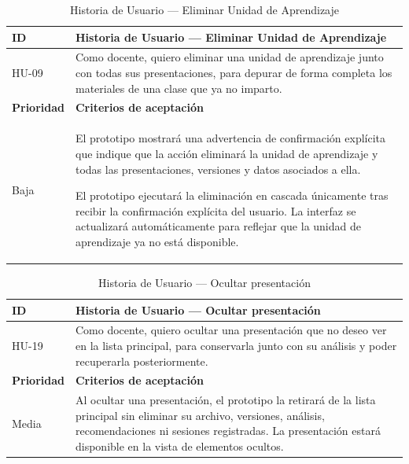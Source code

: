 \documentclass[11pt]{article}
\begin{document}
\begin{table}[H]
    \centering
    \renewcommand{\arraystretch}{1.2}
    \begin{tabular}{|p{2.5cm}|p{11cm}|}
        \hline
        \textbf{ID} & \textbf{Historia de Usuario --- Eliminar Unidad de Aprendizaje} \\
        \hline
        HU-09 & Como docente, quiero eliminar una unidad de aprendizaje junto con todas sus presentaciones, para depurar de forma completa los materiales de una clase que ya no imparto. \\
        \hline
        \textbf{Prioridad} & \textbf{Criterios de aceptación} \\
        \hline
        Baja & El prototipo mostrará una advertencia de confirmación explícita que indique que la acción eliminará la unidad de aprendizaje y todas las presentaciones, versiones y datos asociados a ella. 
        
        El prototipo ejecutará la eliminación en cascada únicamente tras recibir la confirmación explícita del usuario. La interfaz se actualizará automáticamente para reflejar que la unidad de aprendizaje ya no está disponible. \\
        \hline
    \end{tabular}
    \caption{Historia de Usuario — Eliminar Unidad de Aprendizaje}
    \label{tab:hu-eliminar-unidad-aprendizaje}
\end{table}

\begin{table}[H]
    \centering
    \renewcommand{\arraystretch}{1.2}
    \begin{tabular}{|p{2.5cm}|p{11cm}|}
        \hline
        \textbf{ID} & \textbf{Historia de Usuario --- Ocultar presentación} \\
        \hline
        HU-19 & Como docente, quiero ocultar una presentación que no deseo ver en la lista principal, para conservarla junto con su análisis y poder recuperarla posteriormente. \\
        \hline
        \textbf{Prioridad} & \textbf{Criterios de aceptación} \\
        \hline
        Media & Al ocultar una presentación, el prototipo la retirará de la lista principal sin eliminar su archivo, versiones, análisis, recomendaciones ni sesiones registradas. La presentación estará disponible en la vista de elementos ocultos. \\
        \hline
    \end{tabular}
    \caption{Historia de Usuario --- Ocultar presentación}
    \label{tab:hu-ocultar-presentacion}
\end{table}
\end{document}
